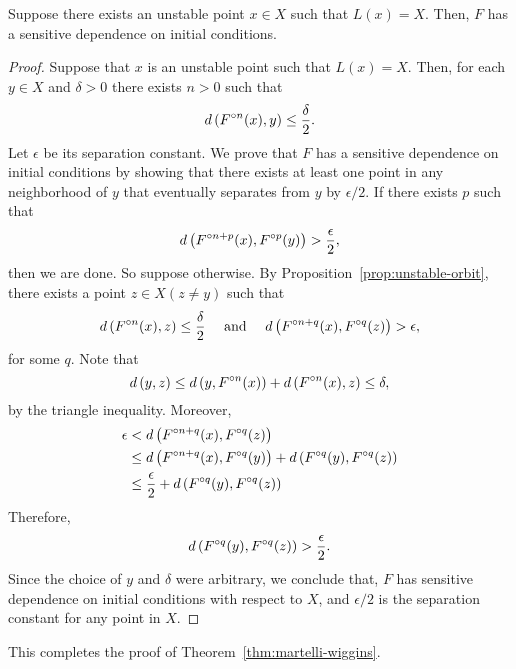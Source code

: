 \documentclass[12pt,draft,twoside]{book}
\begin{document}
\begin{proposition}
  Suppose there exists an unstable point $x \in X$ such that $L(x) = X$.
  Then, $F$ has a sensitive dependence on initial conditions.
  \label{prop:martelli-wiggins2}
  \begin{proof}
    Suppose that $x$ is an unstable point such that $L(x) = X$.
    Then, for each $y\in X$ and $\delta > 0$ there exists $n>0$ such that 
    \begin{equation*}
      d\left( F^{\circ n}(x), y \right) \leq \frac{\delta}{2}.
    \end{equation*}
    Let $\epsilon$ be its separation constant.
    We prove that $F$ has a sensitive dependence on initial conditions by showing that there exists at least one point in any neighborhood of $y$ that eventually separates from $y$ by $\epsilon/2$.
    If there exists $p$ such that 
    \begin{equation*}
      d\left( F^{\circ n+p}(x), F^{\circ p}(y) \right) > \frac{\epsilon}{2},
    \end{equation*}
    then we are done.
    So suppose otherwise.
    By Proposition~\ref{prop:unstable-orbit}, there exists a point $z \in X (z \neq y)$ such that 
    \begin{equation*}
      d\left( F^{\circ n}(x), z \right) \leq \frac{\delta}{2} 
      \quad \mbox{ and } \quad
      d\left( F^{\circ n+q}(x), F^{\circ q}(z) \right) > \epsilon,
    \end{equation*}
    for some $q$.
    Note that
    \begin{equation*}
      d\left( y, z \right) \leq d\left( y, F^{\circ n}(x) \right) + d\left( F^{\circ n}(x), z \right) \leq \delta,
    \end{equation*}
    by the triangle inequality.
    Moreover,
    \begin{align*}
      \epsilon &< d\left( F^{\circ n+q}(x), F^{\circ q}(z) \right) \\
      &\leq d\left( F^{\circ n+q}(x), F^{\circ q}(y) \right) + d\left( F^{\circ q}(y), F^{\circ q}(z) \right)  \\
      &\leq \frac{\epsilon}{2} + d\left( F^{\circ q}(y), F^{\circ q}(z) \right)
    \end{align*}
    Therefore,
    \begin{equation*}
      d\left( F^{\circ q}(y), F^{\circ q}(z) \right) > \frac{\epsilon}{2}.
    \end{equation*}
    Since the choice of $y$ and $\delta$ were arbitrary, we conclude that, $F$ has sensitive dependence on initial conditions with respect to $X$, and 
    $\epsilon/2$ is the separation constant for any point in $X$.
  \end{proof}
\end{proposition}
This completes the proof of Theorem~\ref{thm:martelli-wiggins}.
\end{document}
